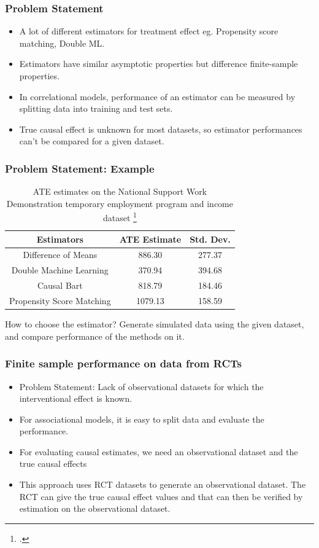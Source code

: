 \documentclass{beamer}
\begin{document}
\begin{frame}
	\frametitle{Problem Statement}
	\begin{itemize}
		\item A lot of different estimators for treatment effect eg. Propensity score matching, Double ML.
		\item Estimators have similar asymptotic properties but difference finite-sample properties.
		\item In correlational models, performance of an estimator can be measured by
			splitting data into training and test sets.
		\item True causal effect is unknown for most datasets, so estimator performances
			can't be compared for a given dataset.
	\end{itemize}
\end{frame}

\begin{frame}
	\frametitle{Problem Statement: Example}
	\begin{table}[h!]
		\centering
		\begin{tabularx}{\textwidth}{||c c c||} 
		 \hline
		 \textbf{Estimators}  & \textbf{ATE Estimate} & \textbf{Std. Dev.} \\
		 \hline\hline
		 Difference of Means & 886.30 & 277.37 \\ 
		 Double Machine Learning & 370.94 & 394.68 \\
		 Causal Bart & 818.79 & 184.46 \\
		 Propensity Score Matching & 1079.13 & 158.59 \\
		 \hline
		\end{tabularx}
		\caption*{ATE estimates on the National Support Work Demonstration temporary employment program and income dataset \footcite{parikh2022evaluating}}
		\label{table:estimates}
	\end{table}
	How to choose the estimator?
	Generate simulated data using the given dataset, and compare performance of the methods on it.
\end{frame}

\begin{frame}
	\frametitle{Finite sample performance on data from RCTs}
	\begin{itemize}
		\item Problem Statement: Lack of observational datasets for which the interventional effect is known.
		\item For associational models, it is easy to split data and evaluate the performance.
		\item For evaluating causal estimates, we need an observational dataset and the true causal effects
		\item This approach uses RCT datasets to generate an observational dataset. The RCT can give the true causal effect values and that can then be verified by estimation on the observational dataset.
	\end{itemize}
\end{frame}
\end{document}
